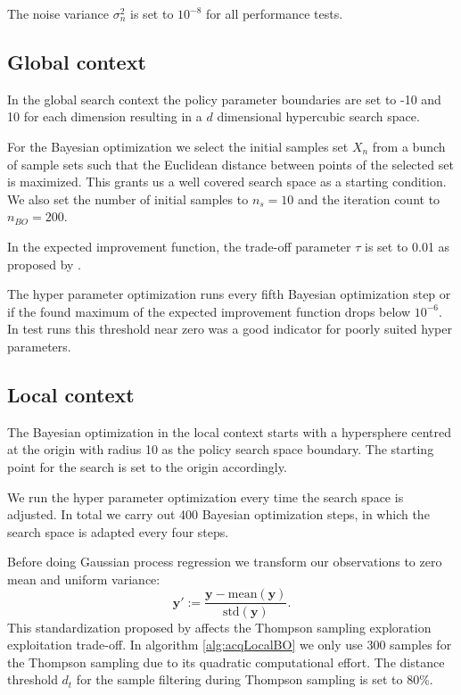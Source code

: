 The noise variance $\sigma_n^2$ is set to $10^{-8}$ for all performance tests.

\subsection{Global context}

In the global search context the policy parameter boundaries are set to -10 and 10 for each dimension resulting in a $d$ dimensional hypercubic search space.

For the Bayesian optimization we select the initial samples set $X_n$ from a bunch of sample sets such that the Euclidean distance between points of the selected set is maximized. This grants us a well covered search space as a starting condition. We also set the number of initial samples to $n_{s} = 10$ and the iteration count to $n_{BO} = 200$.

In the expected improvement function, the trade-off parameter $\tau$ is set to 0.01 as proposed by \cite{brochu2010tutorial}.

The hyper parameter optimization runs every fifth Bayesian optimization step or if the found maximum of the expected improvement function drops below $10^{-6}$. In test runs this threshold near zero was a good indicator for poorly suited hyper parameters.

\subsection{Local context}
The Bayesian optimization in the local context starts with a hypersphere centred at the origin with radius 10 as the policy search space boundary. The starting point for the search is set to the origin accordingly.

We run the hyper parameter optimization every time the search space is adjusted. In total we carry out 400 Bayesian optimization steps, in which the search space is adapted every four steps.

Before doing Gaussian process regression we transform our observations to zero mean and uniform variance:
$$\mathbf{y'} := \frac{\mathbf{y}-\mathrm{mean}(\mathbf{y})}{\mathrm{std}(\mathbf{y})}.$$
This standardization proposed by \cite{akrour2017local} affects the Thompson sampling exploration exploitation trade-off. In algorithm \ref{alg:acqLocalBO} we only use 300 samples for the Thompson sampling due to its quadratic computational effort. The distance threshold $d_t$  for the sample filtering during Thompson sampling is set to 80\%.
